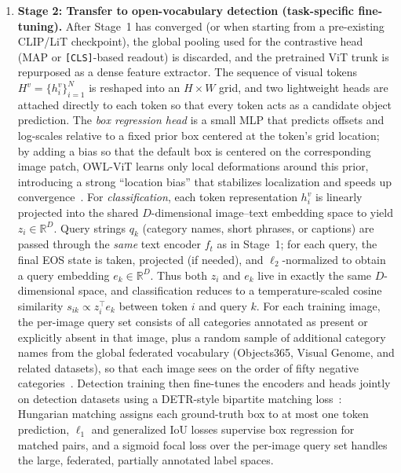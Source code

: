 \begin{enrichment}
\begin{enrichment}[Method][subsection]
\begin{enumerate}
			\item \textbf{Stage 2: Transfer to open-vocabulary detection (task-specific fine-tuning).}
			After Stage~1 has converged (or when starting from a pre-existing CLIP/LiT checkpoint), the global pooling used for the contrastive head (MAP or \texttt{[CLS]}-based readout) is discarded, and the pretrained ViT trunk is repurposed as a dense feature extractor.
			The sequence of visual tokens $H^v = \{h^v_i\}_{i=1}^N$ is reshaped into an $H \times W$ grid, and two lightweight heads are attached directly to each token so that every token acts as a candidate object prediction.
			The \emph{box regression head} is a small MLP that predicts offsets and log-scales relative to a fixed prior box centered at the token’s grid location; by adding a bias so that the default box is centered on the corresponding image patch, OWL-ViT learns only local deformations around this prior, introducing a strong ``location bias'' that stabilizes localization and speeds up convergence~\cite{minderer2022_owlvit}.
			For \emph{classification}, each token representation $h^v_i$ is linearly projected into the shared $D$-dimensional image--text embedding space to yield $z_i \in \mathbb{R}^D$.
			Query strings $q_k$ (category names, short phrases, or captions) are passed through the \emph{same} text encoder $f_t$ as in Stage~1; for each query, the final EOS state is taken, projected (if needed), and $\ell_2$-normalized to obtain a query embedding $e_k \in \mathbb{R}^D$.
			Thus both $z_i$ and $e_k$ live in exactly the same $D$-dimensional space, and classification reduces to a temperature-scaled cosine similarity $s_{ik} \propto z_i^\top e_k$ between token $i$ and query $k$.
			For each training image, the per-image query set consists of all categories annotated as present or explicitly absent in that image, plus a random sample of additional category names from the global federated vocabulary (Objects365, Visual Genome, and related datasets), so that each image sees on the order of fifty negative categories~\cite{minderer2022_owlvit}.
			Detection training then fine-tunes the encoders and heads jointly on detection datasets using a DETR-style bipartite matching loss~\cite{carion2020_detr}: Hungarian matching assigns each ground-truth box to at most one token prediction, $\ell_1$ and generalized IoU losses supervise box regression for matched pairs, and a sigmoid focal loss over the per-image query set handles the large, federated, partially annotated label spaces.
			
			\newpage
			

\end{enumerate}
\end{enrichment}
\end{enrichment}
